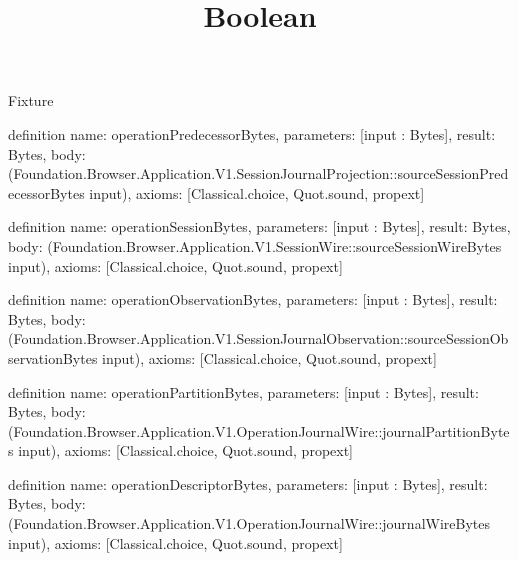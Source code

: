 \begin{lexlean}{Fixture}
\title{Boolean}
\begin{semanticmodule}
definition{
  name: operationPredecessorBytes,
  parameters: [input : Bytes],
  result: Bytes,
  body: (Foundation.Browser.Application.V1.SessionJournalProjection::sourceSessionPredecessorBytes input),
  axioms: [Classical.choice, Quot.sound, propext]
}

definition{
  name: operationSessionBytes,
  parameters: [input : Bytes],
  result: Bytes,
  body: (Foundation.Browser.Application.V1.SessionWire::sourceSessionWireBytes input),
  axioms: [Classical.choice, Quot.sound, propext]
}

definition{
  name: operationObservationBytes,
  parameters: [input : Bytes],
  result: Bytes,
  body: (Foundation.Browser.Application.V1.SessionJournalObservation::sourceSessionObservationBytes input),
  axioms: [Classical.choice, Quot.sound, propext]
}

definition{
  name: operationPartitionBytes,
  parameters: [input : Bytes],
  result: Bytes,
  body: (Foundation.Browser.Application.V1.OperationJournalWire::journalPartitionBytes input),
  axioms: [Classical.choice, Quot.sound, propext]
}

definition{
  name: operationDescriptorBytes,
  parameters: [input : Bytes],
  result: Bytes,
  body: (Foundation.Browser.Application.V1.OperationJournalWire::journalWireBytes input),
  axioms: [Classical.choice, Quot.sound, propext]
}
\end{semanticmodule}
\end{lexlean}
